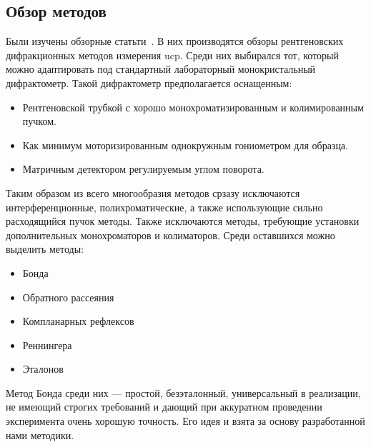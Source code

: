 \documentclass[a4paper, 12pt]{article}
\begin{document}
\subsection{Обзор методов}
Были изучены обзорные статьти~\cite{Lider:2020,Galdecka:2006}.
В них производятся обзоры рентгеновских дифракционных методов измерения \gls{ucp}.
Среди них выбирался тот, который можно адаптировать под стандартный лабораторный монокристальный дифрактометр.
Такой дифрактометр предполагается оснащенным:
\begin{itemize}
    \item Рентгеновской трубкой с хорошо монохроматизированным и колимированным пучком.
    \item Как минимум моторизированным однокружным гониометром для образца.
    \item Матричным детектором регулируемым углом поворота.
\end{itemize}
Таким образом из всего многообразия методов срзазу исключаются интерференционные, полихроматические, а также использующие сильно расходящийся пучок методы. Также исключаются методы, требующие установки дополнительных монохроматоров и колиматоров.
Среди оставшихся можно выделить методы:
\begin{itemize}
    \item Бонда
    \item Обратного рассеяния
    \item Компланарных рефлексов
    \item Реннингера
    \item Эталонов
\end{itemize}
Метод Бонда среди них --- простой, безэталонный, универсальный в реализации, не имеющий строгих требований и дающий при аккуратном проведении эксперимента очень хорошую точность.
Его идея и взята за основу разработанной нами методики.
\end{document}
